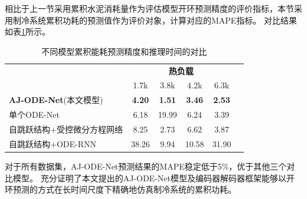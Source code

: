 相比于上一节采用累积水泥消耗量作为评估模型开环预测精度的评价指标，本节采用制冷系统累积功耗的预测值作为评价对象，计算对应的MAPE指标。
对比结果如表\ref{tab:Compare power}所示。
\begin{table}[t]
    \centering
    \caption{不同模型累积能耗预测精度和推理时间的对比}
    \begin{tabular}{lccccc} 
    \toprule
                                & \multicolumn{4}{c}{\textbf{\textbf{热负载}}} \\
    \multicolumn{1}{c}{}        & 1.7k          & 3.8k          & 4.2k          & 6.3k\\ 
    \hline
    \textbf{AJ-ODE-Net}(本文模型) & \textbf{4.20} & \textbf{1.51} & \textbf{3.46} & \textbf{2.53}            \\
    单个ODE-Net              & 6.18          & 19.99         & 6.24          & 3.39    \\
    自跳跃结构+受控微分方程网络\cite{kidger2020neural}     & 8.25         & 2.73          & 6.62         & 3.87           \\
    自跳跃结构+ODE-RNN & 38.26         & 9.94          & 10.58         & 31.90    \\
    \bottomrule
    \end{tabular}
    \label{tab:Compare power}
\end{table}
对于所有数据集，AJ-ODE-Net预测结果的MAPE稳定低于5\%，优于其他三个对比模型。
充分证明了本文提出的AJ-ODE-Net模型及编码器解码器框架能够以开环预测的方式在长时间尺度下精确地仿真制冷系统的累积功耗。


